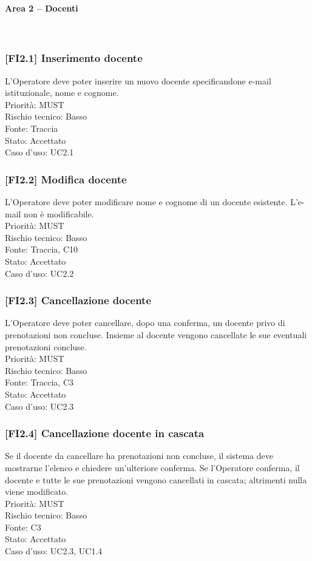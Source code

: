\paragraph{Area 2 – Docenti}~\\
\subsubsection{[FI2.1] Inserimento docente}
L'Operatore deve poter inserire un nuovo docente specificandone e-mail istituzionale, nome e cognome.\\
Priorità: MUST\\Rischio tecnico: Basso\\Fonte: Traccia\\Stato: Accettato\\Caso d'uso: UC2.1

\subsubsection{[FI2.2] Modifica docente}
L'Operatore deve poter modificare nome e cognome di un docente esistente. L'e-mail non è modificabile.\\
Priorità: MUST\\Rischio tecnico: Basso\\Fonte: Traccia, C10\\Stato: Accettato\\Caso d'uso: UC2.2

\subsubsection{[FI2.3] Cancellazione docente}
L'Operatore deve poter cancellare, dopo una conferma, un docente privo di prenotazioni non concluse. Insieme al docente vengono cancellate le sue eventuali prenotazioni concluse.\\
Priorità: MUST\\Rischio tecnico: Basso\\Fonte: Traccia, C3\\Stato: Accettato\\Caso d'uso: UC2.3

\subsubsection{[FI2.4] Cancellazione docente in cascata}
Se il docente da cancellare ha prenotazioni non concluse, il sistema deve mostrarne l'elenco e chiedere un'ulteriore conferma. Se l'Operatore conferma, il docente e tutte le sue prenotazioni vengono cancellati in cascata; altrimenti nulla viene modificato.\\
Priorità: MUST\\Rischio tecnico: Basso\\Fonte: C3\\Stato: Accettato\\Caso d'uso: UC2.3, UC1.4

